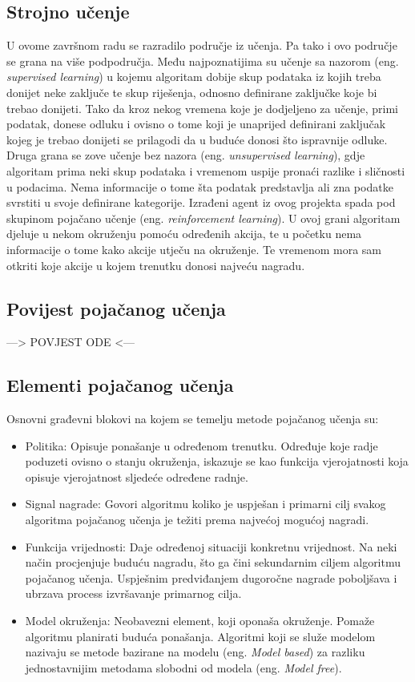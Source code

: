 \subsection{Strojno učenje}
U ovome završnom radu se razradilo područje iz učenja. Pa tako i ovo područje se grana na više podpodručja. Među najpoznatijima su učenje sa nazorom (eng. \textit{supervised learning}) u kojemu algoritam dobije skup podataka iz kojih treba donijet neke zaključe te skup riješenja, odnosno definirane zaključke koje bi trebao donijeti. Tako da kroz nekog vremena koje je dodjeljeno za učenje, primi podatak, donese odluku i ovisno 
o tome koji je unaprijed definirani zaključak kojeg je trebao donijeti se prilagodi da u buduće donosi što ispravnije odluke. Druga grana se zove učenje bez nazora (eng. \textit{unsupervised learning}), gdje algoritam prima neki skup podataka i vremenom uspije pronaći razlike i sličnosti u podacima. Nema informacije o tome šta podatak predstavlja ali zna podatke svrstiti u svoje definirane kategorije. Izrađeni agent iz ovog projekta spada pod skupinom pojačano učenje (eng. \textit{reinforcement learning}). U ovoj grani algoritam djeluje u nekom okruženju pomoću određenih akcija, te u početku nema informacije o tome kako akcije utječu na okruženje. Te vremenom mora sam otkriti koje akcije u kojem trenutku donosi najveću nagradu.


\subsection{Povijest pojačanog učenja}
---> POVJEST ODE <---

\subsection{Elementi pojačanog učenja}
Osnovni građevni blokovi na kojem se temelju metode pojačanog učenja su:
\begin{itemize}
	\item Politika: Opisuje ponašanje u određenom trenutku. Određuje koje radje poduzeti ovisno o stanju okruženja, iskazuje se kao funkcija vjerojatnosti koja opisuje vjerojatnost sljedeće određene radnje.
	
	\item Signal nagrade: Govori algoritmu koliko je uspješan i primarni cilj svakog algoritma pojačanog učenja je težiti prema najvećoj mogućoj nagradi. 
	
	\item Funkcija vrijednosti: Daje određenoj situaciji konkretnu vrijednost. Na neki način procjenjuje buduću nagradu, što ga čini sekundarnim ciljem algoritmu pojačanog učenja. Uspješnim predviđanjem dugoročne nagrade poboljšava i ubrzava process izvršavanje primarnog cilja. 
	
	\item Model okruženja: Neobavezni element, koji oponaša okruženje. Pomaže algoritmu planirati buduća ponašanja. Algoritmi koji se služe modelom nazivaju se metode bazirane na modelu (eng. \textit{Model based}) za razliku jednostavnijim metodama slobodni od modela (eng. \textit{Model free}).
\end{itemize}

